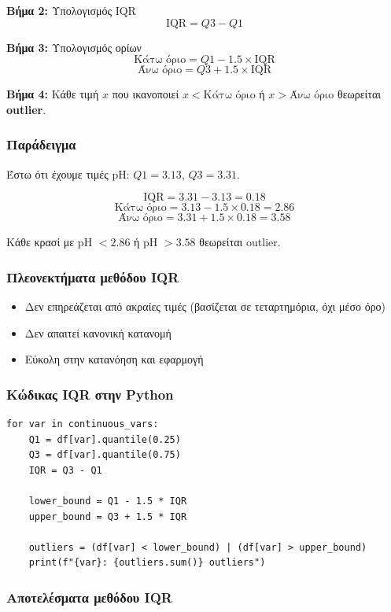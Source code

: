 \documentclass[12pt,a4paper]{article}
\begin{document}
\textbf{Βήμα 2:} Υπολογισμός IQR
$$\text{IQR} = Q3 - Q1$$

\textbf{Βήμα 3:} Υπολογισμός ορίων
$$\text{Κάτω όριο} = Q1 - 1.5 \times \text{IQR}$$
$$\text{Άνω όριο} = Q3 + 1.5 \times \text{IQR}$$

\textbf{Βήμα 4:} Κάθε τιμή $x$ που ικανοποιεί $x < \text{Κάτω όριο}$ ή $x > \text{Άνω όριο}$ θεωρείται \textbf{outlier}.

\subsubsection{Παράδειγμα}

Έστω ότι έχουμε τιμές pH: $Q1 = 3.13$, $Q3 = 3.31$.

$$\text{IQR} = 3.31 - 3.13 = 0.18$$
$$\text{Κάτω όριο} = 3.13 - 1.5 \times 0.18 = 2.86$$
$$\text{Άνω όριο} = 3.31 + 1.5 \times 0.18 = 3.58$$

Κάθε κρασί με pH $< 2.86$ ή pH $> 3.58$ θεωρείται outlier.

\subsubsection{Πλεονεκτήματα μεθόδου IQR}

\begin{itemize}
    \item Δεν επηρεάζεται από ακραίες τιμές (βασίζεται σε τεταρτημόρια, όχι μέσο όρο)
    \item Δεν απαιτεί κανονική κατανομή
    \item Εύκολη στην κατανόηση και εφαρμογή
\end{itemize}

\subsubsection{Κώδικας IQR στην Python}

\begin{lstlisting}
for var in continuous_vars:
    Q1 = df[var].quantile(0.25)
    Q3 = df[var].quantile(0.75)
    IQR = Q3 - Q1

    lower_bound = Q1 - 1.5 * IQR
    upper_bound = Q3 + 1.5 * IQR

    outliers = (df[var] < lower_bound) | (df[var] > upper_bound)
    print(f"{var}: {outliers.sum()} outliers")
\end{lstlisting}

\subsubsection{Αποτελέσματα μεθόδου IQR}
\end{document}

